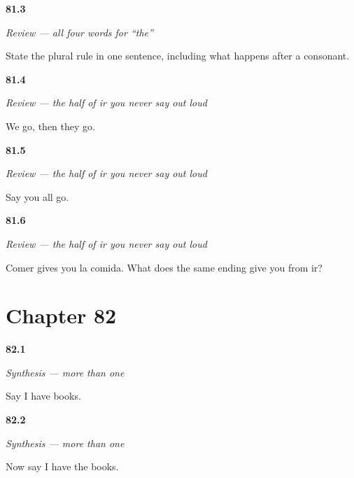 \noindent\begin{minipage}[t]{\linewidth}
\raggedright
\hypertarget{review-ES-C44-repaso-articulos-rule}{\textbf{81.3}} \emph{Review — all four words for \textquotedblleft{}the\textquotedblright{}}\par
\small State the plural rule in one sentence, including what happens after a consonant.
\end{minipage}\par\medskip

\noindent\begin{minipage}[t]{\linewidth}
\raggedright
\hypertarget{review-ES-C44-repaso-ir-ida-plural}{\textbf{81.4}} \emph{Review — the half of \emph{ir} you never say out loud}\par
\small We go, then they go.
\end{minipage}\par\medskip

\noindent\begin{minipage}[t]{\linewidth}
\raggedright
\hypertarget{review-ES-C44-repaso-ir-ida-vosotros}{\textbf{81.5}} \emph{Review — the half of \emph{ir} you never say out loud}\par
\small Say you all go.
\end{minipage}\par\medskip

\noindent\begin{minipage}[t]{\linewidth}
\raggedright
\hypertarget{review-ES-C44-repaso-ir-ida-build}{\textbf{81.6}} \emph{Review — the half of \emph{ir} you never say out loud}\par
\small Comer gives you la comida. What does the same ending give you from ir?
\end{minipage}\par\medskip

\section*{Chapter 82}

\noindent\begin{minipage}[t]{\linewidth}
\raggedright
\hypertarget{review-ES-C44-sintesis-mas-de-uno-bare}{\textbf{82.1}} \emph{Synthesis — more than one}\par
\small Say I have books.
\end{minipage}\par\medskip

\noindent\begin{minipage}[t]{\linewidth}
\raggedright
\hypertarget{review-ES-C44-sintesis-mas-de-uno-definite}{\textbf{82.2}} \emph{Synthesis — more than one}\par
\small Now say I have the books.
\end{minipage}\par\medskip

